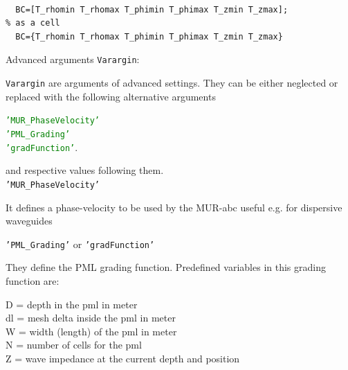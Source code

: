 	 \\
         \begin{lstlisting}[caption={\texttt{BC} in a cylindrical coordinate},label={ListingCylinBC}]
% as a vector
  BC=[T_rhomin T_rhomax T_phimin T_phimax T_zmin T_zmax];
% as a cell
  BC={T_rhomin T_rhomax T_phimin T_phimax T_zmin T_zmax}
	  \end{lstlisting}%
	      Advanced arguments \texttt{Varargin}:
      \begin{myindentpar} \texttt{Varargin}  are  arguments of advanced settings. They can be either neglected or replaced with the following alternative arguments  
		\begin{myindentpar}
		  \textcolor{green}{\texttt{'MUR\_PhaseVelocity'}}\\
		  \textcolor{green}{\texttt{'PML\_Grading'}}\\
		  \textcolor{green}{\texttt{'gradFunction'}}.
		\end{myindentpar}
      and respective values following them.\vspace{2mm}\\
		\texttt{'MUR\_PhaseVelocity'} 
		  \begin{myindentpar}
		      It defines a phase-velocity to be used by the MUR-abc
		      useful e.g. for dispersive waveguides
		  \end{myindentpar}
	    \vspace{2mm} 
	      \texttt{'PML\_Grading'} or \texttt{'gradFunction'} 
		\begin{myindentpar}
		They define the PML grading function.\vspace{2mm}
			    Predefined variables in this grading function are:
			      \begin{myindentpar}
				D  = depth in the pml in meter\\
				dl = mesh delta inside the pml in meter\\
				W  = width (length) of the pml in meter\\
				N  = number of cells for the pml\\
				Z  = wave impedance at the current depth and position
			    \end{myindentpar}
		\end{myindentpar}
      \end{myindentpar}


